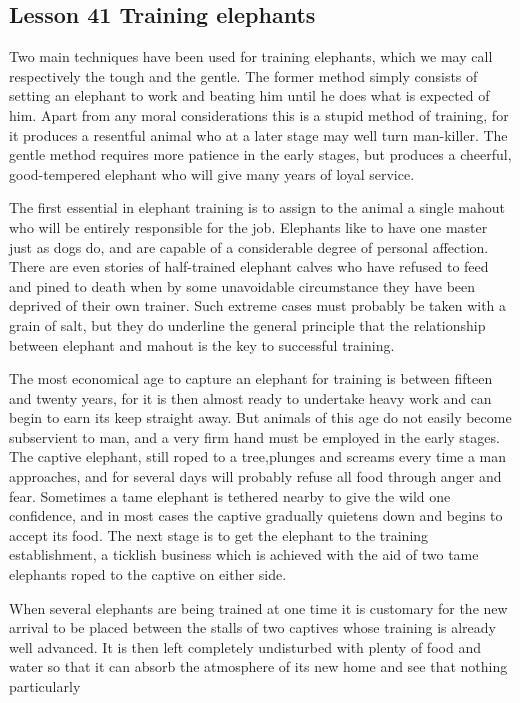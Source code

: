 \documentclass[kindlepaper]{BHCexam4kindle}
\begin{document}
\subsection{Lesson 41
Training elephants}
\par
Two main techniques have been used for training elephants, which we may call respectively the tough and the
gentle. The former method simply consists of setting an elephant to work and beating him until he does what is
expected of him. Apart from any moral considerations this is a stupid method of training, for it produces a
resentful animal who at a later stage may well turn man-killer. The gentle method requires more patience in the
early stages, but produces a cheerful, good-tempered elephant who will give many years of loyal service.
\par
The first essential in elephant training is to assign to the animal a single mahout who will be entirely
responsible for the job. Elephants like to have one master just as dogs do, and are capable of a considerable
degree of personal affection. There are even stories of half-trained elephant calves who have refused to feed
and pined to death when by some unavoidable circumstance they have been deprived of their own trainer. Such
extreme cases must probably be taken with a grain of salt, but they do underline the general principle that the
relationship between elephant and mahout is the key to successful training.
\par
The most economical age to capture an elephant for training is between fifteen and twenty years, for it is
then almost ready to undertake heavy work and can begin to earn its keep straight away. But animals of this
age do not easily become subservient to man, and a very firm hand must be employed in the early stages. The
captive elephant, still roped to a tree,plunges and screams every time a man approaches, and for several days
will probably refuse all food through anger and fear. Sometimes a tame elephant is tethered nearby to give the
wild one confidence, and in most cases the captive gradually quietens down and begins to accept its food. The
next stage is to get the elephant to the training establishment, a ticklish business which is achieved with the aid
of two tame elephants roped to the captive on either side.
\par
When several elephants are being trained at one time it is customary for the new arrival to be placed between
the stalls of two captives whose training is already well advanced. It is then left completely undisturbed with
plenty of food and water so that it can absorb the atmosphere of its new home and see that nothing particularly
\end{document}
